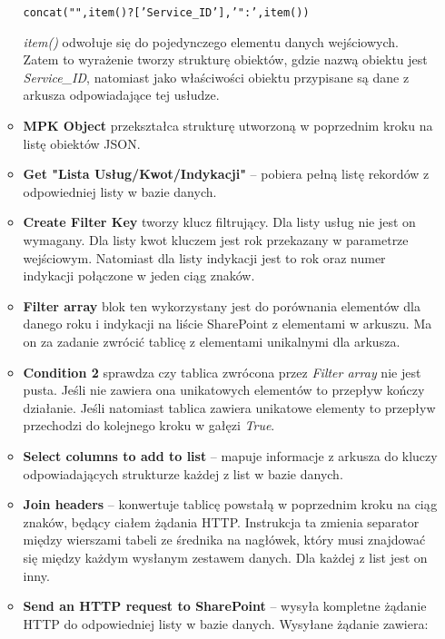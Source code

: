 \begin{enumerate}
\begin{itemize}[label=\textasteriskcentered]
                    \begin{center}
                        \texttt{concat("",item()?['Service\_ID'],'":',item())}
                    \end{center}

                    \emph{item()} odwołuje się do pojedynczego elementu danych wejściowych. Zatem to wyrażenie tworzy strukturę obiektów, gdzie nazwą obiektu jest \emph{Service\_ID}, natomiast jako właściwości obiektu przypisane są dane z arkusza odpowiadające tej usłudze.
              \item \textbf{MPK Object} przekształca strukturę utworzoną w poprzednim kroku na listę obiektów JSON.
          \end{itemize}

          \begin{itemize}
              \item\textbf{Get "Lista Usług/Kwot/Indykacji"} -- pobiera pełną listę rekordów z odpowiedniej listy w bazie danych.
              \item \textbf{Create Filter Key} tworzy klucz filtrujący. Dla listy usług nie jest on wymagany. Dla listy kwot kluczem jest rok przekazany w parametrze wejściowym. Natomiast dla listy indykacji jest to rok oraz numer indykacji połączone w jeden ciąg znaków.
              \item \textbf{Filter array} blok ten wykorzystany jest do porównania elementów dla danego roku i indykacji na liście SharePoint z elementami w arkuszu. Ma on za zadanie zwrócić tablicę z elementami unikalnymi dla arkusza.
              \item \textbf{Condition 2} sprawdza czy tablica zwrócona przez \emph{Filter array} nie jest pusta. Jeśli nie zawiera ona unikatowych elementów to przepływ kończy działanie.
                    Jeśli natomiast tablica zawiera unikatowe elementy to przepływ przechodzi do kolejnego kroku w gałęzi \emph{True}.
              \item \textbf{Select columns to add to list} -- mapuje informacje z arkusza do kluczy odpowiadających strukturze każdej z list w bazie danych.
              \item \textbf{Join headers} -- konwertuje tablicę powstałą w poprzednim kroku na ciąg znaków, będący ciałem żądania HTTP. Instrukcja ta zmienia separator między wierszami tabeli ze średnika na nagłówek, który musi znajdować się między każdym wysłanym zestawem danych. Dla każdej z list jest on inny.
              \item \textbf{Send an HTTP request to SharePoint} -- wysyła kompletne żądanie HTTP do odpowiedniej listy w bazie danych. Wysyłane żądanie zawiera:

\end{itemize}
\end{enumerate}
